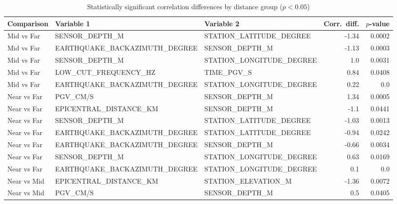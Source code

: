\begin{table}[H]
\centering
\caption{Statistically significant correlation differences by distance group ($p < 0.05$)}
\label{tab:corr_diff}
\begin{tabular}{lllrr}
\toprule
Comparison & Variable 1 & Variable 2 & Corr.\ diff. & $p$-value \\
\midrule
Mid vs Far & SENSOR_DEPTH_M & STATION_LATITUDE_DEGREE & -1.34 & 0.0002 \\
Mid vs Far & EARTHQUAKE_BACKAZIMUTH_DEGREE & SENSOR_DEPTH_M & -1.13 & 0.0003 \\
Mid vs Far & SENSOR_DEPTH_M & STATION_LONGITUDE_DEGREE & 1.0 & 0.0031 \\
Mid vs Far & LOW_CUT_FREQUENCY_HZ & TIME_PGV_S & 0.84 & 0.0408 \\
Mid vs Far & EARTHQUAKE_BACKAZIMUTH_DEGREE & STATION_LONGITUDE_DEGREE & 0.22 & 0.0 \\
Near vs Far & PGV_CM/S & SENSOR_DEPTH_M & 1.34 & 0.0005 \\
Near vs Far & EPICENTRAL_DISTANCE_KM & SENSOR_DEPTH_M & -1.1 & 0.0441 \\
Near vs Far & SENSOR_DEPTH_M & STATION_LATITUDE_DEGREE & -1.03 & 0.0013 \\
Near vs Far & EARTHQUAKE_BACKAZIMUTH_DEGREE & STATION_LATITUDE_DEGREE & -0.94 & 0.0242 \\
Near vs Far & EARTHQUAKE_BACKAZIMUTH_DEGREE & SENSOR_DEPTH_M & -0.66 & 0.0034 \\
Near vs Far & SENSOR_DEPTH_M & STATION_LONGITUDE_DEGREE & 0.63 & 0.0169 \\
Near vs Far & EARTHQUAKE_BACKAZIMUTH_DEGREE & STATION_LONGITUDE_DEGREE & 0.1 & 0.0 \\
Near vs Mid & EPICENTRAL_DISTANCE_KM & STATION_ELEVATION_M & -1.36 & 0.0072 \\
Near vs Mid & PGV_CM/S & SENSOR_DEPTH_M & 0.5 & 0.0405 \\
\bottomrule
\end{tabular}
\end{table}